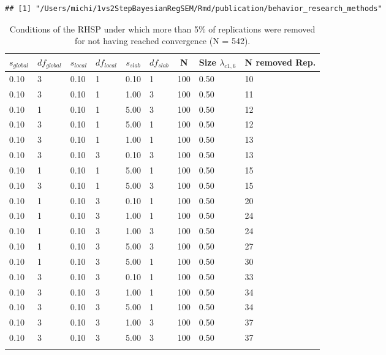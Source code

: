 \documentclass[
  man, donotrepeattitle,floatsintext]{apa6}
\begin{document}
\begin{verbatim}
## [1] "/Users/michi/1vs2StepBayesianRegSEM/Rmd/publication/behavior_research_methods"
\end{verbatim}

\begin{table}[tbp]

\begin{center}
\begin{threeparttable}

\caption{\label{tab:unnamed-chunk-3}Conditions of the RHSP under which more than 5\% of replications were removed for not having reached convergence (N = 542).}

\begin{tabular}{lllllllll}
\toprule
$s_{global}$ & \multicolumn{1}{c}{$df_{global}$} & \multicolumn{1}{c}{$s_{local}$} & \multicolumn{1}{c}{$df_{local}$} & \multicolumn{1}{c}{$s_{slab}$} & \multicolumn{1}{c}{$df_{slab}$} & \multicolumn{1}{c}{N} & \multicolumn{1}{c}{Size $\lambda_{c1 , 6}$} & \multicolumn{1}{c}{N removed Rep.}\\
\midrule
0.10 & 3 & 0.10 & 1 & 0.10 & 1 & 100 & 0.50 & 10\\
0.10 & 3 & 0.10 & 1 & 1.00 & 3 & 100 & 0.50 & 11\\
0.10 & 1 & 0.10 & 1 & 5.00 & 3 & 100 & 0.50 & 12\\
0.10 & 3 & 0.10 & 1 & 5.00 & 1 & 100 & 0.50 & 12\\
0.10 & 3 & 0.10 & 1 & 1.00 & 1 & 100 & 0.50 & 13\\
0.10 & 3 & 0.10 & 3 & 0.10 & 3 & 100 & 0.50 & 13\\
0.10 & 1 & 0.10 & 1 & 5.00 & 1 & 100 & 0.50 & 15\\
0.10 & 3 & 0.10 & 1 & 5.00 & 3 & 100 & 0.50 & 15\\
0.10 & 1 & 0.10 & 3 & 0.10 & 1 & 100 & 0.50 & 20\\
0.10 & 1 & 0.10 & 3 & 1.00 & 1 & 100 & 0.50 & 24\\
0.10 & 1 & 0.10 & 3 & 1.00 & 3 & 100 & 0.50 & 24\\
0.10 & 1 & 0.10 & 3 & 5.00 & 3 & 100 & 0.50 & 27\\
0.10 & 1 & 0.10 & 3 & 5.00 & 1 & 100 & 0.50 & 30\\
0.10 & 3 & 0.10 & 3 & 0.10 & 1 & 100 & 0.50 & 33\\
0.10 & 3 & 0.10 & 3 & 1.00 & 1 & 100 & 0.50 & 34\\
0.10 & 3 & 0.10 & 3 & 5.00 & 1 & 100 & 0.50 & 34\\
0.10 & 3 & 0.10 & 3 & 1.00 & 3 & 100 & 0.50 & 37\\
0.10 & 3 & 0.10 & 3 & 5.00 & 3 & 100 & 0.50 & 37\\
\bottomrule
\addlinespace
\end{tabular}


\end{threeparttable}
\end{center}
\end{table}
\end{document}
